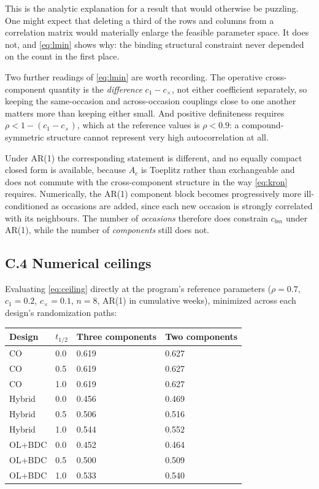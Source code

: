 \documentclass[
  11pt,
]{article}
\newcounter{none} %
\begin{document}
This is the analytic explanation for a result that would otherwise be
puzzling. One might expect that deleting a third of the rows and
columns from a correlation matrix would materially enlarge the
feasible parameter space. It does not, and \eqref{eq:lmin} shows why:
the binding structural constraint never depended on the count in the
first place.

Two further readings of \eqref{eq:lmin} are worth recording. The
operative cross-component quantity is the \emph{difference}
\(c_1 - c_{\times}\), not either coefficient separately, so keeping the
same-occasion and across-occasion couplings close to one another
matters more than keeping either small. And positive definiteness
requires \(\rho < 1 - (c_1 - c_{\times})\), which at the reference
values is \(\rho < 0.9\): a compound-symmetric structure cannot
represent very high autocorrelation at all.

Under AR(1) the corresponding statement is different, and no equally
compact closed form is available, because \(A_c\) is Toeplitz rather
than exchangeable and does not commute with the cross-component
structure in the way \eqref{eq:kron} requires. Numerically, the AR(1)
component block becomes progressively more ill-conditioned as
occasions are added, since each new occasion is strongly correlated
with its neighbours. The number of \emph{occasions} therefore does
constrain \(c_{bm}\) under AR(1), while the number of \emph{components}
still does not.

\subsection{C.4 Numerical ceilings}

Evaluating \eqref{eq:ceiling} directly at the program's reference
parameters (\(\rho = 0.7\), \(c_1 = 0.2\), \(c_{\times} = 0.1\), \(n = 8\),
AR(1) in cumulative weeks), minimized across each design's
randomization paths:

{\def\LTcaptype{none} %
\begin{longtable}[]{@{}llll@{}}
\toprule\noalign{}
Design & \(t_{1/2}\) & Three components & Two components \\
\midrule\noalign{}
\endhead
\bottomrule\noalign{}
\endlastfoot
CO & 0.0 & 0.619 & 0.627 \\
CO & 0.5 & 0.619 & 0.627 \\
CO & 1.0 & 0.619 & 0.627 \\
Hybrid & 0.0 & 0.456 & 0.469 \\
Hybrid & 0.5 & 0.506 & 0.516 \\
Hybrid & 1.0 & 0.544 & 0.552 \\
OL+BDC & 0.0 & 0.452 & 0.464 \\
OL+BDC & 0.5 & 0.500 & 0.509 \\
OL+BDC & 1.0 & 0.533 & 0.540 \\
\end{longtable}
}
\end{document}
